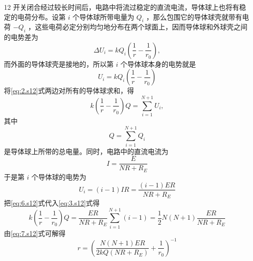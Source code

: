 \begin{solution}{12}
开关闭合经过较长时间后，电路中将流过稳定的直流电流，导体球上也将有稳定的电荷分布。设第 $i$ 个导体球所带电量为 $Q_{i}$ ，那么包围它的导体球壳就带有电荷 $-Q_{i}$ ，这些电荷必定分别均匀地分布在两个球面上，因而导体球和外球壳之间的电势差为
\begin{equation}
\Delta U _ {i} = k Q _ {i} \left(\frac {1}{r} - \frac {1}{r _ {0}}\right),
\label{eq:1.s12}
\end{equation}
而外面的导体球壳是接地的，所以第 $i$ 个导体球本身的电势就是
\begin{equation}
U _ {i} = k Q _ {i} \left(\frac {1}{r} - \frac {1}{r _ {0}}\right)
\label{eq:2.s12}
\end{equation}
将\eqref{eq:2.s12}式两边对所有的导体球求和，得
\begin{equation}
k \left(\frac {1}{r} - \frac {1}{r _ {0}}\right) Q = \sum_ {i = 1} ^ {N + 1} U _ {i},
\label{eq:3.s12}
\end{equation}
其中
\begin{equation}
Q = \sum_ {i = 1} ^ {N + 1} Q _ {i}
\label{eq:4.s12}
\end{equation}
是导体球上所带的总电量。同时，电路中的直流电流为
\begin{equation}
I = \frac {E}{N R + R _ {E}}
\label{eq:5.s12}
\end{equation}
于是第 $i$ 个导体球的电势为
\begin{equation}
U _ {i} = (i - 1) I R = \frac {(i - 1) E R}{N R + R _ {E}}
\label{eq:6.s12}
\end{equation}
把\eqref{eq:6.s12}式代入\eqref{eq:3.s12}式得
\begin{equation}
k \left(\frac {1}{r} - \frac {1}{r _ {0}}\right) Q = \frac {E R}{N R + R _ {E}} \sum_ {i = 1} ^ {N + 1} (i - 1) = \frac {1}{2} N (N + 1) \frac {E R}{N R + R _ {E}}
\label{eq:7.s12}
\end{equation}
由\eqref{eq:7.s12}式可解得
\begin{equation}
r = \left(\frac {N (N + 1) E R}{2 k Q (N R + R _ {E})} + \frac {1}{r _ {0}}\right) ^ {- 1}
\label{eq:8.s12}
\end{equation}
\end{solution}